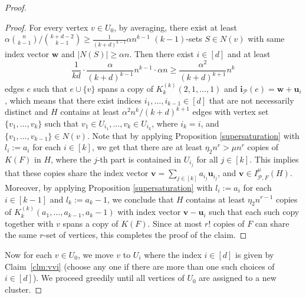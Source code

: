 \documentclass[11pt, letterpaper]{amsart}
\theoremstyle{plain}
\numberwithin{equation}{section}
\theoremstyle{definition}
\renewcommand{\vec}[1]{{\mathbf #1}}
\begin{document}
\begin{proof}
\begin{proof}
For every vertex $ v\in U_0 $, by averaging, there exist at least $\alpha\binom{n}{k-1}/\binom{k+d-2}{k-1}\ge \frac{1}{(k+d)^{k-1}}\alpha n^{k-1}$ $(k-1)$-sets $S\in N(v)$ with same index vector $\vec{w}$ and $|N(S)|\ge \alpha n$. 
Then there exist \(i\in [d]\) and at least 
\[
\frac{1}{kd}\cdot\frac{\alpha}{(k+d)^{k-1}}n^{k-1}\cdot\alpha n\ge \frac{\alpha^2} {(k+d)^{k+1}} n^k
\]
edges $e$ such that $e\cup\{v\}$ spans a copy of $K_k^{(k)}(2,1,\dots,1)$ and $\vec{i}_{\mathcal{P}}(e)=\vec{w}+\vec{u}_i$, which means that there exist indices $i_1,\dots,i_{k-1}\in[d]$ that are not necessarily distinct and $H$ contains at least ${\alpha}^2 n^{k}/(k+d)^{k+1}$ edges with vertex set $\{v_1,\dots,v_k\}$ such that $v_1\in U_{i_1},\dots,v_{k}\in U_{i_{k}}$, where \(i_k=i\), and $\{v_1,\dots,v_{k-1}\}\in N(v)$. 
Note that by applying Proposition \ref{supersaturation} with $l_i:=a_i$ for each $i\in [k]$, we get that there are at least $\eta_2 n^r>\mu n^r$ copies of $K(F)$ in $H$, where the $ j $-th part is contained in $ U_{i_j} $ for all $ j \in [k] $. 
This implies that these copies share the index vector $\vec{v}=\sum_{j\in [k]}a_{i_j}\vec{u}_{i_j}$, and $\vec{v}\in I^{\mu}_{\mathcal{P},F}(H)$. 
Moreover, by applying Proposition \ref{supersaturation} with $l_i:=a_i$ for each $i\in [k-1]$ and $l_k:=a_k-1$, we conclude that $H$ contains at least $\eta_2 n^{r-1}$ copies of $K_k^{(k)}(a_1,\dots,a_{k-1},a_k-1)$ with index vector $\vec{v}-\vec{u}_i$ such that each such copy together with $v$ spans a copy of $K(F)$. Since at most \(r!\) copies of \(F\) can share the same \(r\)-set of vertices, this completes the proof of the claim.
\end{proof}

Now for each $v\in U_0$, we move $v$ to $U_i$ where the index $i\in [d]$ is given by Claim~\ref{clm:vvi} (choose any one if there are more than one such choices of $i\in [d]$). %
We proceed greedily until all vertices of $U_0$ are assigned to a new cluster.


\end{proof}
\end{document}
